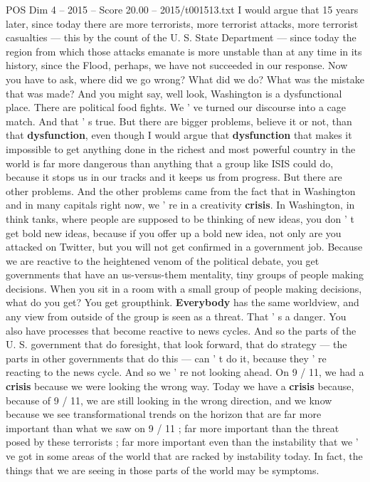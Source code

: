 \begin{textsample}{POS Dim 4 – 2015 – Score 20.00 – 2015/t001513.txt}
I would argue that 15 years later, since today there are more terrorists, more terrorist attacks, more terrorist casualties — this by the count of the U.
S.
State Department — since today the region from which those attacks emanate is more unstable than at any time in its history, since the Flood, perhaps, we have not succeeded in our response.
Now you have to ask, where did we go wrong?
What did we do?
What was the mistake that was made?
And you might say, well look, Washington is a dysfunctional place.
There are political food fights.
We ' ve turned our discourse into a cage match.
And that ' s true.
But there are bigger problems, believe it or not, than that \textbf{dysfunction}, even though I would argue that \textbf{dysfunction} that makes it impossible to get anything done in the richest and most powerful country in the world is far more dangerous than anything that a group like ISIS could do, because it stops us in our tracks and it keeps us from progress.
But there are other problems.
And the other problems came from the fact that in Washington and in many capitals right now, we ' re in a creativity \textbf{crisis}.
In Washington, in think tanks, where people are supposed to be thinking of new ideas, you don ' t get bold new ideas, because if you offer up a bold new idea, not only are you attacked on Twitter, but you will not get confirmed in a government job.
Because we are reactive to the heightened venom of the political debate, you get governments that have an us-versus-them mentality, tiny groups of people making decisions.
When you sit in a room with a small group of people making decisions, what do you get?
You get groupthink. \textbf{Everybody} has the same worldview, and any view from outside of the group is seen as a threat.
That ' s a danger.
You also have processes that become reactive to news cycles.
And so the parts of the U.
S. government that do foresight, that look forward, that do strategy — the parts in other governments that do this — can ' t do it, because they ' re reacting to the news cycle.
And so we ' re not looking ahead.
On 9 / 11, we had a \textbf{crisis} because we were looking the wrong way.
Today we have a \textbf{crisis} because, because of 9 / 11, we are still looking in the wrong direction, and we know because we see transformational trends on the horizon that are far more important than what we saw on 9 / 11 ; far more important than the threat posed by these terrorists ; far more important even than the instability that we ' ve got in some areas of the world that are racked by instability today.
In fact, the things that we are seeing in those parts of the world may be symptoms.

\end{textsample}
